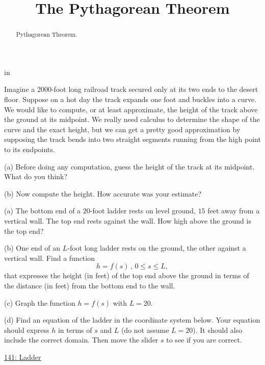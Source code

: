 \documentclass{ximera}
\title{The Pythagorean Theorem}
\newcommand{\pskip}{\vskip 0.1 in}
\begin{document}
\begin{abstract}
Pythagorean Theorem.
\end{abstract}
\maketitle


\pskip


\begin{question}  \label{Q324dfg45rhp}
Imagine a 2000-foot long railroad track secured only at its two ends to the desert floor. Suppose on a hot day the track expands one foot and buckles into a curve. We would like to compute, or at least approximate, the height of the track above the ground at its midpoint. We really need calculus to determine the shape of the curve and the exact height, but we can get a pretty good approximation by supposing the track bends into two straight segments running from the high point to its endpoints.


\begin{freeResponse}
(a) Before doing any computation, guess the height of the track at its midpoint. What do you think?
\end{freeResponse}

(b) Now compute the height. How accurate was your estimate?
\end{question}


\begin{question}  \label{Qdfdst4nb554334}
(a) The bottom end of a $20$-foot ladder rests on level ground, $15$ feet away from a vertical wall. The top end rests against the wall. How high above the ground is the top end?

(b) One end of an $L$-foot long ladder rests on the ground, the other against a vertical wall. Find a function 
\[
  h = f(s) \, , \, 0\leq s \leq L,
\]
that expresses the height (in feet) of the top end above the ground in terms of the distance (in feet) from the bottom end to the wall.

(c)  Graph the function $h = f(s)$ with $L=20$.

(d) Find an equation of the ladder in the coordinate system below. Your equation should express $h$ in terms of $s$ and $L$ (do not assume $L=20$). It should also include the correct domain. Then move the slider $s$ to see if you are correct.

\begin{exploration}

\begin{onlineOnly}
    \begin{center}
\end{center}
\end{onlineOnly}

\href{https://www.desmos.com/calculator/orpmncb1dx}{141: Ladder}

\end{exploration}

\end{question}
\end{document}
